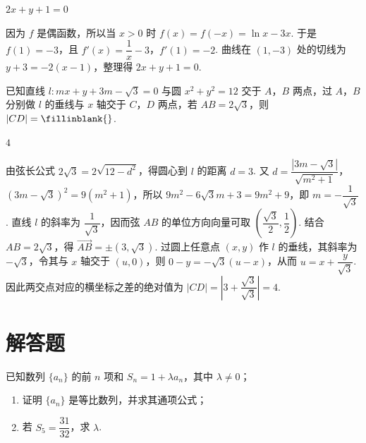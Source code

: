 \begin{answer}
\(2x+y+1=0\)
\end{answer}

\begin{solution}
因为 \(f\) 是偶函数，所以当 \(x>0\) 时 \(f(x)=f(-x)=\ln x-3x\). 于是 \(f(1)=-3\)，且 \(f'(x)=\dfrac1x-3\)，\(f'(1)=-2\). 曲线在 \((1,-3)\) 处的切线为 \(y+3=-2(x-1)\)，整理得 \(2x+y+1=0\).
\end{solution}

\begin{problem}
已知直线 \(l:mx+y+3m-\sqrt3=0\) 与圆 \(x^2+y^2=12\) 交于 \(A\)，\(B\) 两点，过 \(A\)，\(B\) 分别做 \(l\) 的垂线与 \(x\) 轴交于 \(C\)，\(D\) 两点，若 \(AB=2\sqrt3\)，则 \(|CD|=\fillinblank{}\).
\end{problem}

\begin{answer}
\(4\)
\end{answer}

\begin{solution}
由弦长公式 \(2\sqrt3=2\sqrt{12-d^2}\)，得圆心到 \(l\) 的距离 \(d=3\). 又 \(d=\dfrac{|3m-\sqrt3|}{\sqrt{m^2+1}}\)，\((3m-\sqrt3)^2=9(m^2+1)\)，所以 \(9m^2-6\sqrt3m+3=9m^2+9\)，即 \(m=-\dfrac1{\sqrt3}\). 直线 \(l\) 的斜率为 \(\dfrac1{\sqrt3}\)，因而弦 \(AB\) 的单位方向向量可取 \(\left(\dfrac{\sqrt3}{2},\dfrac12\right)\). 结合 \(AB=2\sqrt3\)，得 \(\overrightarrow{AB}=\pm(3,\sqrt3)\). 过圆上任意点 \((x,y)\) 作 \(l\) 的垂线，其斜率为 \(-\sqrt3\)，令其与 \(x\) 轴交于 \((u,0)\)，则 \(0-y=-\sqrt3(u-x)\)，从而 \(u=x+\dfrac{y}{\sqrt3}\). 因此两交点对应的横坐标之差的绝对值为 \(|CD|=\left|3+\dfrac{\sqrt3}{\sqrt3}\right|=4\).
\end{solution}

\section{解答题}

\begin{problem}
已知数列 \(\{a_n\}\) 的前 \(n\) 项和 \(S_n=1+\lambda a_n\)，其中 \(\lambda\ne0\)；

\begin{enumerate}
\item 证明 \(\{a_n\}\) 是等比数列，并求其通项公式；
\item 若 \(S_5=\dfrac{31}{32}\)，求 \(\lambda\).
\end{enumerate}
\end{problem}

